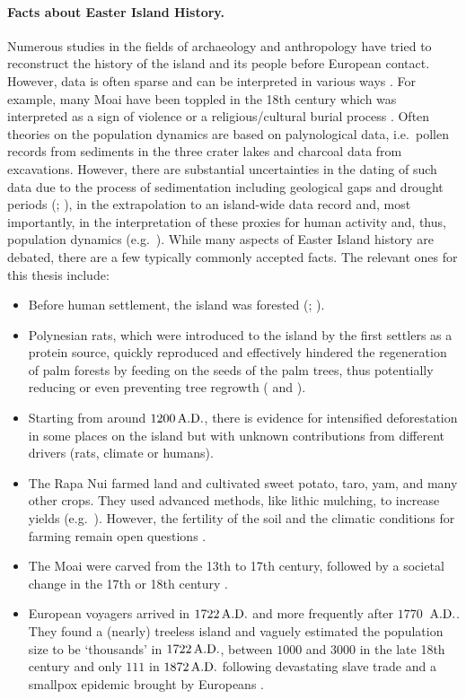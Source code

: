 \paragraph{Facts about Easter Island History.}
Numerous studies in the fields of archaeology and anthropology have tried to reconstruct the history of the island and its people before European contact.
However, data is often sparse and can be interpreted in various ways \citep{Merico2017}.
For example, many Moai have been toppled in the 18th century which was interpreted as a sign of violence \citep{Bahn2017} or a religious/cultural burial process \citep{Cauwe2011}.
Often theories on the population dynamics are based on palynological data, i.e.\ pollen records from sediments in the three crater lakes and charcoal data from excavations.
However, there are substantial uncertainties in the dating of such data due to the process of sedimentation including geological gaps and drought periods (; ), in the extrapolation to an island-wide data record \citep{Rull2020} and, most importantly, in the interpretation of these proxies for human activity and, thus, population dynamics (e.g.\ ).
While many aspects of Easter Island history are debated, there are a few typically commonly accepted facts.
The relevant ones for this thesis include:
\begin{itemize}
	\item Before human settlement, the island was forested (; ).
	\item Polynesian rats, which were introduced to the island by the first settlers as a protein source, quickly reproduced and effectively hindered the regeneration of palm forests by feeding on the seeds of the palm trees, thus potentially reducing or even preventing tree regrowth ( and ).
	\item Starting from around $1200\,{\rm A.D.}$, there is evidence for intensified deforestation in some places on the island \citep{Rull2020} but with unknown contributions from different drivers (rats, climate or humans).
	\item The Rapa Nui farmed land and cultivated sweet potato, taro, yam, and many other crops. They used advanced methods, like lithic mulching, to increase yields (e.g.\ ). However, the fertility of the soil and the climatic conditions for farming remain open questions \citep{Bahn2017}.
	\item The Moai were carved from the 13th to 17th century, followed by a societal change in the 17th or 18th century \citep{Cauwe2011}.
	\item European voyagers arrived in $1722\, {\rm A.D.}$ and more frequently after $1770\,$ ${\rm A.D.}$. They found a (nearly) treeless island and vaguely estimated the population size to be `thousands' in $1722\, {\rm A.D.}$, between $1000$ and $3000$ in the late 18th century and only $111$ in $1872\, {\rm A.D.}$ following devastating slave trade and a smallpox epidemic brought by Europeans \citep{Bahn2017}.
\end{itemize}

